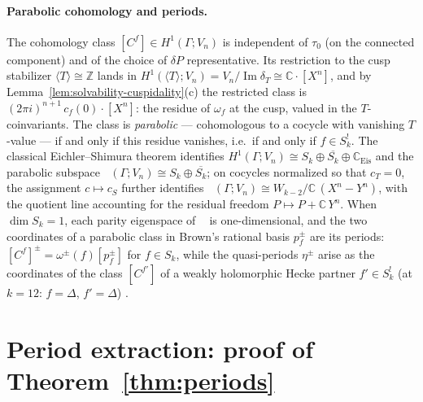 \documentclass[11pt]{article}
\numberwithin{equation}{section}  %
\newcommand{\ZZ}{\mathbb{Z}}
\newcommand{\CC}{\mathbb{C}}
\newcommand{\Dhat}{\widehat{\Delta}}
\DeclareMathOperator{\im}{Im}
\DeclareMathOperator{\Hpar}{H^1_{\mathrm{par}}}
\begin{document}
\paragraph{Parabolic cohomology and periods.}
The cohomology class $[C^f] \in H^1(\Gamma; V_n)$ is independent of
$\tau_0$ (on the connected component) and of the choice of $\delta P$
representative.  Its restriction to the cusp stabilizer
$\langle T \rangle \cong \ZZ$ lands in
$H^1(\langle T \rangle; V_n) = V_n / \im \delta_T \cong \CC\cdot[X^n]$,
and by Lemma~\ref{lem:solvability-cuspidality}(c) the restricted class is
$(2\pi i)^{n+1}\, c_f(0) \cdot [X^n]$: the residue of $\omega_f$ at the
cusp, valued in the $T$-coinvariants.  The class is \emph{parabolic} ---
cohomologous to a cocycle with vanishing $T$-value --- if and only if
this residue vanishes, i.e.\ if and only if $f \in S^!_k$.  The classical
Eichler--Shimura theorem \cite{KZ1984} identifies
$H^1(\Gamma; V_n) \cong S_k \oplus \overline{S_k} \oplus
\CC_{\mathrm{Eis}}$ and the parabolic subspace
$\Hpar(\Gamma; V_n) \cong S_k \oplus \overline{S_k}$; on cocycles
normalized so that $c_T = 0$, the assignment $c \mapsto c_S$ further
identifies $\Hpar(\Gamma; V_n) \cong W_{k-2}/\CC\,(X^n - Y^n)$, with the
quotient line accounting for the residual freedom
$P \mapsto P + \CC\, Y^n$.  When $\dim S_k = 1$, each parity eigenspace
of $\Hpar$ is one-dimensional, and the two coordinates of a parabolic
class in Brown's rational basis $p^\pm_f$ are its periods:
$[C^f]^\pm = \omega^\pm(f)[p^\pm_f]$ for $f \in S_k$, while the
quasi-periods $\eta^\pm$ arise as the coordinates of the class
$[C^{f'}]$ of a weakly holomorphic Hecke partner $f' \in S^!_k$ (at
$k = 12$: $f = \Delta$, $f' = \Dhat$)
\cite{Brown2017}. %


\section{Period extraction: proof of Theorem~\ref{thm:periods}}\label{sec:periods}
\end{document}
